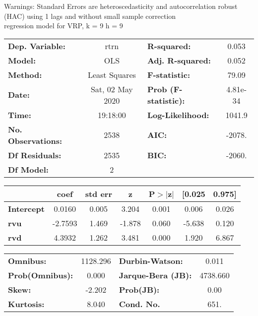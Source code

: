 Warnings: \newline
 [1] Standard Errors are heteroscedasticity and autocorrelation robust (HAC) using 1 lags and without small sample correction\\ 

regression model for VRP, k = 9 h = 9\begin{center}
\begin{tabular}{lclc}
\toprule
\textbf{Dep. Variable:}    &       rtrn       & \textbf{  R-squared:         } &     0.053   \\
\textbf{Model:}            &       OLS        & \textbf{  Adj. R-squared:    } &     0.052   \\
\textbf{Method:}           &  Least Squares   & \textbf{  F-statistic:       } &     79.09   \\
\textbf{Date:}             & Sat, 02 May 2020 & \textbf{  Prob (F-statistic):} &  4.81e-34   \\
\textbf{Time:}             &     19:18:00     & \textbf{  Log-Likelihood:    } &    1041.9   \\
\textbf{No. Observations:} &        2538      & \textbf{  AIC:               } &    -2078.   \\
\textbf{Df Residuals:}     &        2535      & \textbf{  BIC:               } &    -2060.   \\
\textbf{Df Model:}         &           2      & \textbf{                     } &             \\
\bottomrule
\end{tabular}
\begin{tabular}{lcccccc}
                   & \textbf{coef} & \textbf{std err} & \textbf{z} & \textbf{P$> |$z$|$} & \textbf{[0.025} & \textbf{0.975]}  \\
\midrule
\textbf{Intercept} &       0.0160  &        0.005     &     3.204  &         0.001        &        0.006    &        0.026     \\
\textbf{rvu}       &      -2.7593  &        1.469     &    -1.878  &         0.060        &       -5.638    &        0.120     \\
\textbf{rvd}       &       4.3932  &        1.262     &     3.481  &         0.000        &        1.920    &        6.867     \\
\bottomrule
\end{tabular}
\begin{tabular}{lclc}
\textbf{Omnibus:}       & 1128.296 & \textbf{  Durbin-Watson:     } &    0.011  \\
\textbf{Prob(Omnibus):} &   0.000  & \textbf{  Jarque-Bera (JB):  } & 4738.660  \\
\textbf{Skew:}          &  -2.202  & \textbf{  Prob(JB):          } &     0.00  \\
\textbf{Kurtosis:}      &   8.040  & \textbf{  Cond. No.          } &     651.  \\
\bottomrule
\end{tabular}
\end{center}

